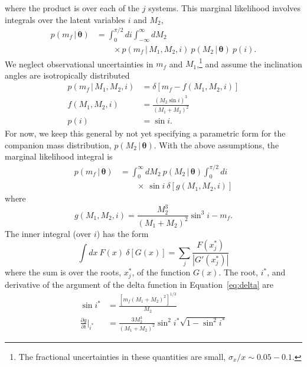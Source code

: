 \documentclass[apjl]{emulateapj}
\newcommand{\given}{\,|\,}
\newcommand{\bs}[1]{\boldsymbol{#1}}
\newcommand{\eqn}{Equation~}
\newcommand{\mf}{m_f}
\begin{document}
where the product is over each of the $j$ systems.  This marginal likelihood involves integrals over the latent variables $i$ and $M_2$,
\begin{align}
    p(\mf \given \bs{\theta}) &= \int_0^{\pi/2} di \int_{-\infty}^\infty dM_2  \nonumber \\
      & \qquad {} \times p(\mf \given M_1, M_2, i)~p(M_2 \given \bs{\theta})~p(i).
\end{align}
We neglect observational uncertainties in $\mf$ and $M_1$,\footnote{The fractional uncertainties in these quantities are small, $\sigma_x / x \sim 0.05-0.1$.} and assume the inclination angles are isotropically distributed
\begin{align}
	p(\mf \given M_1, M_2, i) &= \delta \left[\mf - f(M_1, M_2, i) \right]\\
	f(M_1, M_2, i) &= \frac{(M_2 \sin i)^3}{(M_1 + M_2)^2}\\
	p(i) &= \sin i.
\end{align}
For now, we keep this general by not yet specifying a parametric form for the companion mass distribution, $p(M_2 \given \bs{\theta})$. With the above assumptions, the marginal likelihood integral is
\begin{align}
    p(\mf \given \bs{\theta}) &= \int_{0}^\infty dM_2 ~p(M_2 \given \bs{\theta}) \int_0^{\pi/2} di  \nonumber \\
    & \qquad {} \times ~\sin i ~ \delta \left[g(M_1,M_2,i) \right]\label{eq:delta}
\end{align}
where
\begin{equation}
	g(M_1,M_2,i) = \frac{M_2^3}{(M_1+M_2)^2}\sin^3 i - \mf.
\end{equation}
The inner integral (over $i$) has the form
\begin{equation}
    \int dx~F(x)~\delta \left[ G(x) \right] = \sum_j \frac{F(x^*_j)}{|G'(x^*_j)|}
\end{equation}
where the sum is over the roots, $x^*_j$, of the function $G(x)$. The root, $i^*$, and derivative of the argument of the delta function in \eqn\ref{eq:delta} are 
\begin{align}
	\sin i^* &= \frac{ \left[\mf(M_1+M_2)^2 \right]^{1/3}}{M_2}\\
	\frac{\partial g}{\partial i}\bigg\rvert_{i^*} &= \frac{3M_2^3}{(M_1+M_2)^2} \sin^2 i^* \sqrt{1 - \sin^2 i^*}
\end{align}
\end{document}
